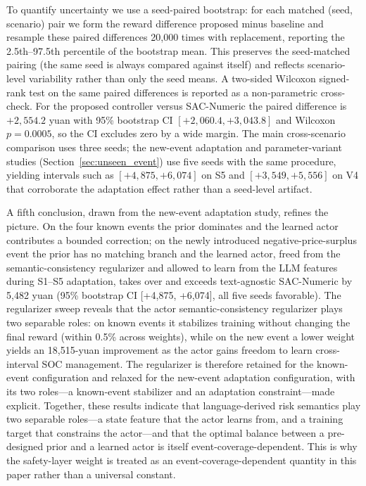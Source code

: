 \documentclass{ieeeaccess}
\begin{document}
To quantify uncertainty we use a seed-paired bootstrap: for each matched (seed, scenario) pair we form the reward difference proposed minus baseline and resample these paired differences 20{,}000 times with replacement, reporting the 2.5th--97.5th percentile of the bootstrap mean. This preserves the seed-matched pairing (the same seed is always compared against itself) and reflects scenario-level variability rather than only the seed means. A two-sided Wilcoxon signed-rank test on the same paired differences is reported as a non-parametric cross-check. For the proposed controller versus SAC-Numeric the paired difference is $+2{,}554.2$ yuan with 95\% bootstrap CI $[+2{,}060.4, +3{,}043.8]$ and Wilcoxon $p=0.0005$, so the CI excludes zero by a wide margin. The main cross-scenario comparison uses three seeds; the new-event adaptation and parameter-variant studies (Section~\ref{sec:unseen_event}) use five seeds with the same procedure, yielding intervals such as $[+4{,}875, +6{,}074]$ on S5 and $[+3{,}549, +5{,}556]$ on V4 that corroborate the adaptation effect rather than a seed-level artifact.

A fifth conclusion, drawn from the new-event adaptation study, refines the picture. On the four known events the prior dominates and the learned actor contributes a bounded correction; on the newly introduced negative-price-surplus event the prior has no matching branch and the learned actor, freed from the semantic-consistency regularizer and allowed to learn from the LLM features during S1--S5 adaptation, takes over and exceeds text-agnostic SAC-Numeric by 5{,}482 yuan (95\% bootstrap CI [+4{,}875, +6{,}074], all five seeds favorable). The regularizer sweep reveals that the actor semantic-consistency regularizer plays two separable roles: on known events it stabilizes training without changing the final reward (within 0.5\% across weights), while on the new event a lower weight yields an 18{,}515-yuan improvement as the actor gains freedom to learn cross-interval SOC management. The regularizer is therefore retained for the known-event configuration and relaxed for the new-event adaptation configuration, with its two roles---a known-event stabilizer and an adaptation constraint---made explicit. Together, these results indicate that language-derived risk semantics play two separable roles---a state feature that the actor learns from, and a training target that constrains the actor---and that the optimal balance between a pre-designed prior and a learned actor is itself event-coverage-dependent. This is why the safety-layer weight is treated as an event-coverage-dependent quantity in this paper rather than a universal constant.
\end{document}
